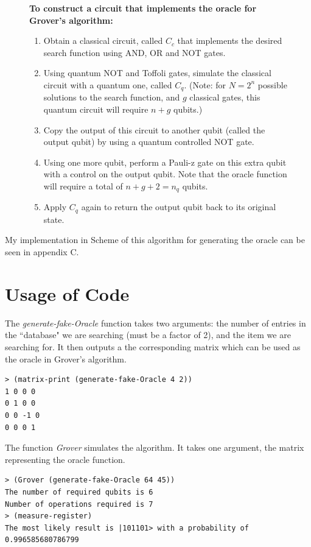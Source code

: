 \documentclass[11pt]{report}
\newcommand{\?}{\stackrel{?}{=}}
\begin{document}
\begin{figure}[H]
\begin{framed}
\textbf{To construct a circuit that implements the oracle for Grover's algorithm:}
\begin{enumerate}
\item Obtain a classical circuit, called $C_{c}$ that implements the desired search function using AND, OR and NOT gates.
\item Using quantum NOT and Toffoli gates, simulate the classical circuit with a quantum one, called $C_{q}$. (Note: for $N=2^n$ possible solutions to the search function, and $g$ classical gates, this quantum circuit will require $n+g$ qubits.)
\item Copy the output of this circuit to another qubit (called the output qubit) by using a quantum controlled NOT gate.
\item Using one more qubit, perform a Pauli-z gate on this extra qubit with a control on the output qubit. Note that the oracle function will require a total of $n+g+2=n_{q}$ qubits.
\item Apply $C_{q}$ again to return the output qubit back to its original state.
\end{enumerate}
\end{framed}
\end{figure}

My implementation in Scheme of this algorithm for generating the oracle can be seen in appendix C.

\section{Usage of Code}

The \textit{generate-fake-Oracle} function takes two arguments: the number of entries in the ``database" we are searching (must be a factor of 2), and the item we are searching for. It then outputs a the corresponding matrix which can be used as the oracle in Grover's algorithm.

\begin{lstlisting}
> (matrix-print (generate-fake-Oracle 4 2))
1 0 0 0 
0 1 0 0 
0 0 -1 0 
0 0 0 1 
\end{lstlisting}

The function \textit{Grover} simulates the algorithm. It takes one argument, the matrix representing the oracle function.

\begin{lstlisting}
> (Grover (generate-fake-Oracle 64 45))
The number of required qubits is 6
Number of operations required is 7
> (measure-register)
The most likely result is |101101> with a probability of 0.996585680786799
\end{lstlisting}
\end{document}
